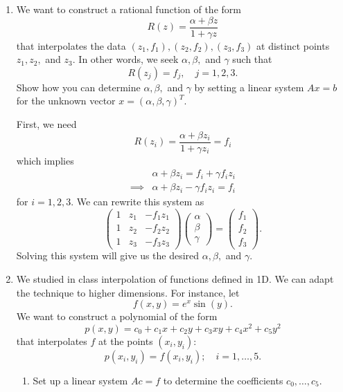 \documentclass[a4paper,12pt]{article}
\newcommand{\pmat}[1]{\begin{pmatrix} #1 \end{pmatrix}}
\begin{document}
\begin{enumerate}[label = \arabic*)]
	\item We want to construct a rational function of the form
	\[
		R(z) = \frac{\alpha + \beta z}{1 + \gamma z}
	\]
	that interpolates the data $ (z_1, f_1), (z_2, f_2), (z_3, f_3) $ at distinct points $ z_1, z_2,  $ and $ z_3 $. In other words, we seek $ \alpha, \beta, $ and $ \gamma $ such that 
	\[
		R(z_j) = f_j, \quad j=1,2,3.
	\]
	Show how you can determine $ \alpha, \beta, $ and $ \gamma $ by setting a linear system $ Ax = b $ for the unknown vector $ x = (\alpha, \beta, \gamma)^T $.
	
	First, we need 
	\[
		R(z_i) = \frac{\alpha + \beta z_i}{1 + \gamma z_i} =  f_i
	\]
	which implies
	\begin{align*}
		& \alpha + \beta z_i = f_i + \gamma f_i z_i \\
		\implies & \alpha + \beta z_i - \gamma f_i z_i = f_i
	\end{align*}
	for $ i = 1,2, 3 $. We can rewrite this system as
	\[
		\pmat{1 & z_1 & -f_1 z_1 \\ 1 & z_2 & -f_2 z_2 \\ 1 & z_3 & -f_3 z_3} \pmat{\alpha \\ \beta \\ \gamma} = \pmat{f_1 \\ f_2 \\ f_3}.
	\]
	Solving this system will give us the desired $ \alpha, \beta, $ and $ \gamma $.
	
	\item We studied in class interpolation of functions defined in 1D. We can adapt the technique to higher dimensions. For instance, let
	\[
		f(x,y) = e^x \sin(y).
	\]
	We want to construct a polynomial of the form
	\[
		p(x,y) = c_0 + c_1x + c_2 y + c_3 xy + c_4 x^2 + c_5 y^2
	\]
	that interpolates $ f $ at the points $ (x_i, y_i) $:
	\begin{equation}
		p(x_i,y_i) = f(x_i, y_i); \quad i = 1, \ldots, 5. \label{equ:pol}
	\end{equation}
	
	\begin{enumerate}[label = (\alph*)]
		\item Set up a linear system $ Ac = f $ to determine the coefficients $ c_0, \ldots, c_5 $.
		

\end{enumerate}
\end{enumerate}
\end{document}
